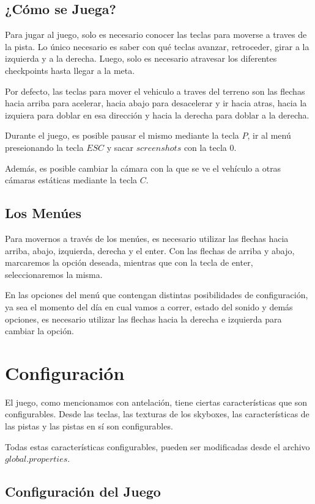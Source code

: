 \documentclass[a4paper,10pt]{article}
\begin{document}
\subsection{¿C\'omo se Juega?}
Para jugar al juego, solo es necesario conocer las teclas para moverse a traves
de la pista.  Lo \'unico necesario es saber con qu\'e teclas avanzar,
retroceder,
girar a la izquierda y a la derecha.  Luego, solo es necesario atravesar los
diferentes checkpoints hasta llegar a la meta.

Por defecto, las teclas para mover el vehiculo a traves del terreno son las
flechas hacia arriba para acelerar, hacia abajo para desacelerar y ir hacia
atras, hacia la izquiera para doblar en esa direcci\'on y hacia la derecha para
doblar a la derecha.

Durante el juego, es posible pausar el mismo mediante la tecla $P$, ir al
men\'u preseionando la tecla $ESC$ y sacar
$screenshots$ con la tecla $0$.

Adem\'as, es posible cambiar la c\'amara con la que se ve el veh\'iculo a otras
c\'amaras est\'aticas mediante la tecla $C$.

\subsection{Los Men\'ues}
Para movernos a trav\'es de los men\'ues, es necesario utilizar las flechas
hacia
arriba, abajo, izquierda, derecha y el enter.  Con las flechas de arriba y
abajo, marcaremos la opci\'on deseada, mientras que con la tecla de enter,
seleccionaremos la misma.

En las opciones del men\'u que contengan distintas posibilidades de
configuraci\'on, ya sea el momento del d\'ia en cual vamos a correr, estado del
sonido y dem\'as opciones, es necesario utilizar las flechas hacia la derecha e
izquierda para cambiar la opci\'on.
\section{Configuraci\'on}
\label{configuracion}
El juego, como mencionamos con antelaci\'on, tiene ciertas caracter\'isticas
que
son configurables.  Desde las teclas, las texturas de los skyboxes, las
caracter\'isticas de las pistas y las pistas en s\'i son configurables.

Todas estas caracter\'isticas configurables, pueden ser modificadas desde el
archivo $global.properties$.

\subsection{Configuraci\'on del Juego}
\end{document}
